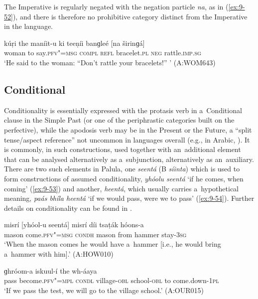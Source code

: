 The Imperative is regularly negated with the negation particle \textit{na}, as in (\ref{ex:9-52}), and there is therefore no prohibitive category distinct from the Imperative in the language.

\begin{exe}
\ex
\label{ex:9-52}
\gll kúṛi the maníit-u ki teeṇíi banɡleé [na širinɡá] \\
woman to say.\textsc{pfv"=msg} \textsc{compl} \textsc{refl} bracelet.\textsc{pl} \textsc{neg} rattle.\textsc{imp.sg} \\
\glt `He said to the woman: ``Don't rattle your bracelets!'' ' (A:WOM643)
\end{exe}

\subsection{Conditional}
\label{subsec:9-2-2}

Conditionality is essentially expressed with the protasis verb in a~Conditional clause in the Simple Past (or one of the periphrastic categories built on the perfective), while the apodosis verb may be in the Present or the Future, a ``split tense/aspect reference'' not uncommon in languages overall (e.g., in Arabic, \citealt[80]{dahl1985}). It is commonly, in such constructions, used together with an~additional element that can be analysed alternatively as a~subjunction, alternatively as an~auxiliary. There are two such elements in Palula, one \textit{seentá} (B \textit{síinta}) which is used to form constructions of assumed conditionality, \textit{yhóolu seentá} `if he comes, when coming' (\ref{ex:9-53}) and another, \textit{heentá}, which usually carries a~hypothetical meaning, \textit{paás bhíla heentá} `if we would pass, were we to pass' (\ref{ex:9-54}). Further details on conditionality can be found in . 

\begin{exe}
\ex
\label{ex:9-53}
\gll misrí [yhóol-u seentá] misrí díi tsaṭák hóons-a \\
mason come.\textsc{pfv"=msg} \textsc{condh} mason from hammer stay-\textsc{3sg} \\
\glt `When the mason comes he would have a~hammer [i.e., he would bring a~hammer with him].' (A:HOW010)

\ex
\label{ex:9-54}
  ɡhróom-a iskuul-í the wh-áaya \\
pass become.\textsc{pfv"=mpl} \textsc{condl}  village-\textsc{obl} school-\textsc{obl} to come.down-\textsc{1pl}\\
\glt `If we pass the test, we will go to the village school.' (A:OUR015)
\end{exe}

